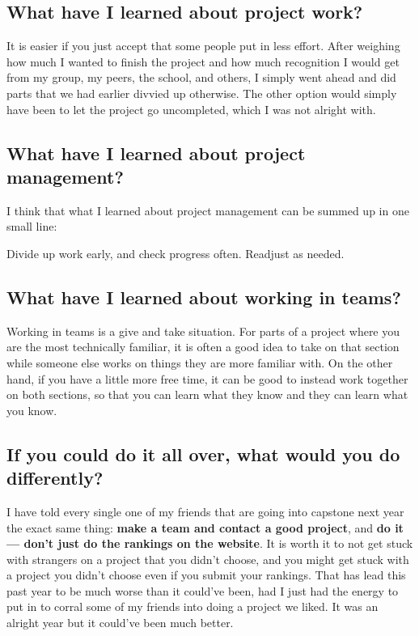 \documentclass[onecolumn, draftclsnofoot,10pt, compsoc]{IEEEtran}
\begin{document}
\subsection{What have I learned about project work?}

It is easier if you just accept that some people put in less effort. After weighing
how much I wanted to finish the project and how much recognition I would get from
my group, my peers, the school, and others, I simply went ahead and did parts that
we had earlier divvied up otherwise. The other option would simply have been to
let the project go uncompleted, which I was not alright with.

\subsection{What have I learned about project management?}

I think that what I learned about project management can be summed up in one small line:

\begin{displayquote}
Divide up work early, and check progress often. Readjust as needed.
\end{displayquote}

\subsection{What have I learned about working in teams?}

Working in teams is a give and take situation. For parts of a project where you
are the most technically familiar, it is often a good idea to take on that section
while someone else works on things they are more familiar with. On the other hand,
if you have a little more free time, it can be good to instead work together on
both sections, so that you can learn what they know and they can learn what you
know.

\subsection{If you could do it all over, what would you do differently?}
I have told every single one of my friends that are going into capstone next year
the exact same thing: \textbf{make a team and contact a good project}, and
\textbf{do it --- don't just do the rankings on the website}. It is worth
it to not get stuck with strangers on a project that you didn't choose, and you
might get stuck with a project you didn't choose even if you submit your rankings.
That has lead this past year to be much worse than it could've been, had I just
had the energy to put in to corral some of my friends into doing a project we
liked. It was an alright year but it could've been much better.
\end{document}
